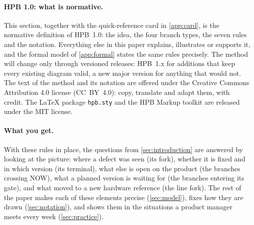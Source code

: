 \paragraph{HPB 1.0: what is normative.}
This section, together with the quick-reference card in \cref{app:card},
is the normative definition of HPB~1.0: the idea, the four branch types,
the seven rules and the notation. Everything else in this paper explains,
illustrates or supports it, and the formal model of \cref{app:formal}
states the same rules precisely. The method will change only through
versioned releases: HPB~1.x for additions that keep every existing diagram
valid, a new major version for anything that would not. The text of the
method and its notation are offered under the Creative Commons Attribution
4.0 license (CC~BY~4.0): copy, translate and adapt them, with credit. The
\LaTeX{} package \texttt{hpb.sty} and the HPB Markup toolkit are released
under the MIT license.

\paragraph{What you get.}
With these rules in place, the questions from \cref{sec:introduction} are
answered by looking at the picture: where a defect was seen (its fork),
whether it is fixed and in which version (its terminal), what else is open
on the product (the branches crossing NOW), what a planned version is
waiting for (the branches entering its gate), and what moved to a new
hardware reference (the line fork). The rest of the paper makes each of
these elements precise (\cref{sec:model}), fixes how they are drawn
(\cref{sec:notation}), and shows them in the situations a product manager
meets every week (\cref{sec:practice}).

